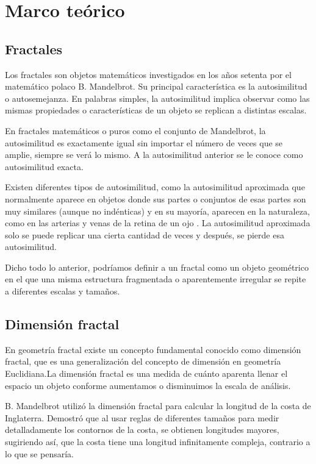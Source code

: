 \chapter{Marco te\'{o}rico}

\section{Fractales}

Los fractales son objetos matem\'{a}ticos investigados en los años setenta por el matem\'{a}tico polaco B.  Mandelbrot. Su principal caracter\'{i}stica es la autosimilitud o autosemejanza. En palabras simples, la autosimilitud implica observar como las mismas propiedades o caracter\'{i}sticas de un objeto se replican a distintas escalas.

En fractales matem\'{a}ticos o puros como el conjunto de Mandelbrot, la autosimilitud es exactamente igual sin importar el n\'{u}mero de veces que se amplie, siempre se ver\'{a} lo mismo. A la autosimilitud anterior se le conoce como autosimilitud exacta.

Existen diferentes tipos de autosimilitud, como la autosimilitud aproximada que normalmente aparece en objetos donde sus partes o conjuntos de esas partes son muy similares (aunque no ind\'{e}nticas) y en su mayor\'{i}a, aparecen en la naturaleza, como en las arterias y venas de la retina de un ojo \cite{Liebovitch1998}. La autosimilitud aproximada solo se puede replicar una cierta cantidad de veces y despu\'{e}s, se pierde esa autosimilitud.

Dicho todo lo anterior, podríamos definir a un fractal como un objeto geom\'{e}trico en el que una misma estructura fragmentada o aparentemente irregular se repite a diferentes escalas y tamaños. 

\section{Dimensi\'{o}n fractal}

En geometr\'{i}a fractal existe un concepto fundamental conocido como dimensi\'{o}n fractal, que es una generalizaci\'{o}n del concepto de dimensi\'{o}n en geometr\'{i}a Euclidiana.La dimensi\'{o}n fractal es una medida de cu\'{a}nto aparenta llenar el espacio un objeto conforme aumentamos o disminuimos la escala de an\'{a}lisis.

B. Mandelbrot utiliz\'{o} la dimensi\'{o}n fractal para calcular la longitud de la costa de Inglaterra. Demostró que al usar reglas de diferentes tamaños para medir detalladamente los contornos de la costa, se obtienen longitudes mayores, sugiriendo así, que la costa tiene una longitud infinitamente compleja, contrario a lo que se pensar\'{i}a. 

